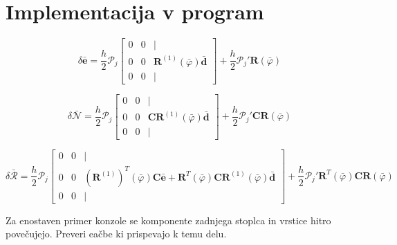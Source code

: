 \documentclass{article}
\newcommand{\dep}[1]{{\scriptstyle(#1)}}
\begin{document}
\newpage
\section{Implementacija v program}
$$\delta\bar{\mathbf{e}} = \frac{h}{2}\mathcal{P}_j
\begin{bmatrix}
0 & 0 & | \\
	0 & 0 & \mathbf{R}^{(1)}\dep{\bar{\varphi}}\bar{\mathbf{d}} \\
0 & 0 & |
\end{bmatrix} + \frac{h}{2}\mathcal{P}_j' \mathbf{R}\dep{\bar{\varphi}}$$


$$\delta\bar{\mathcal{N}} = \frac{h}{2}\mathcal{P}_j
\begin{bmatrix}
0 & 0 & | \\
0 & 0 & \mathbf{CR}^{(1)}\dep{\bar{\varphi}}\bar{\mathbf{d}} \\
0 & 0 & |
\end{bmatrix} + \frac{h}{2}\mathcal{P}_j' \mathbf{CR}\dep{\bar{\varphi}}$$

$$\delta\bar{\mathcal{R}} = \frac{h}{2}\mathcal{P}_j
\begin{bmatrix}
0 & 0 & | \\
0 & 0 & (\mathbf{R}^{(1)})^T\dep{\bar{\varphi}}\mathbf{C}\bar{\mathbf{e}} + \mathbf{R}^T\dep{\bar{\varphi}}\mathbf{CR}^{(1)}\dep{\bar{\varphi}}\bar{\mathbf{d}} \\
0 & 0 & |
\end{bmatrix} + \frac{h}{2}\mathcal{P}_j' \mathbf{R}^T\dep{\bar{\varphi}} \mathbf{CR}\dep{\bar{\varphi}}$$

Za enostaven primer konzole se komponente zadnjega stoplca in vrstice hitro povečujejo. Preveri eačbe ki prispevajo k temu delu.
\end{document}
